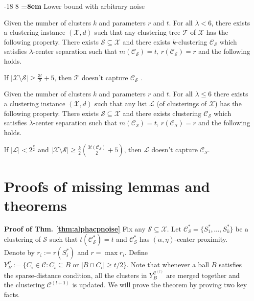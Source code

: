 \documentclass[orivec]{llncs}
\makeatletter
\newcommand{\mc}{\mathcal}
\renewcommand\subsubsection{\@startsection{subsubsection}{3}{\z@}%
   {-18\p@ \@plus -4\p@ \@minus -4\p@}%
   {8\p@ \@plus 4\p@ \@minus 4\p@}%
   {\normalfont\normalsize\bfseries\boldmath
   \rightskip=\z@ \@plus 8em \pretolerance=10000}}
\makeatother
\begin{document}
\subsubsection{Lower bound with arbitrary noise}
\label{section:lambdaLowerBoundArbitrary}

\begin{theorem}
\label{thm:nosparselambdaalg}
Given the number of clusters $k$ and parameters $r$ and $t$. For all $\lambda < 6$, there exists a clustering instance $(\mc X , d)$ such that any clustering tree $\mc T$ of $\mc X$ has the following property. There exists $\mc S \subseteq \mc X$ and there exists $k$-clustering $\mc C_{\mc S}$ which satisfies $\lambda$-center separation such that $m(\mc C_{\mc S}) = t$, $r(\mc C_{\mc S}) = r$ and the following holds.

If $|\mc X\setminus \mc S|\ge \frac{3t}{2}+5$, then $\mc T$ doesn't capture $\mc C_{\mc S}$ .
\end{theorem}

\begin{theorem}
\label{thm:nosparselistlambdacs}
Given the number of clusters $k$ and parameters $r$ and $t$. For all $\lambda \le 6$ there exists a clustering instance $(\mc X, d)$ such that any list $\mc L$ (of clusterings of $\mc X$) has the following property. There exists $\mc S \subseteq \mc X$ and there exists clustering $\mc C_{\mc S}$ which satisfies $\lambda$-center separation such that $m(\mc C_{\mc S}) = t$, $r(\mc C_{\mc S}) = r$ and the following holds.  

If $|\mc L| < 2^{\frac{k}{2}}$ and $|\mc X \setminus \mc S|\ge \frac{k}{2}(\frac{3t(\mc C_{\mc S})}{2}+5)$, then $\mc L$ doesn't capture $\mc C_{\mc S}$.
\end{theorem}



 


\appendix

\section{Proofs of missing lemmas and theorems}

\textbf{Proof of Thm. \ref{thm:alphacpnoise}}
Fix any $\mc S \subseteq \mc X$. Let $\mc C^*_S = \{S_1^*, \ldots, S_k^*\}$ be a clustering of $\mc S$ such that $t(\mc C_{\mc S}^*) = t$ and $\mc C^*_S$ has $(\alpha, \eta)$-center proximity. Denote by $r_i := r(S_i^*)$ and $r = \max r_i$. Define $Y_B^{\mc C} := \{C_i \in \mc C : C_i \subseteq B \text{ or } |B \cap C_i| \ge t/2\}$. Note that whenever a ball $B$ satisfies the sparse-distance condition, all the clusters in $Y_{B}^{{\mc C}^{(l)}}$ are merged together and the clustering $\mc C^{(l+1)}$ is updated. We will prove the theorem by proving two key facts.
\end{document}
